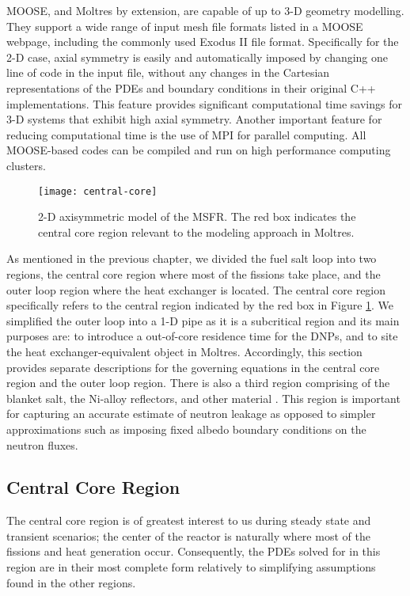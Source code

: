 \gls{MOOSE}, and Moltres by extension, are capable of up to 3-D geometry
modelling. They support a wide range of input mesh file formats listed in a
\gls{MOOSE} webpage, including the commonly used Exodus II file format.
Specifically for the 2-D case, axial symmetry is easily and automatically
imposed by changing one line of code in the input file, without any changes in
the Cartesian representations of the \glspl{PDE} and boundary conditions in
their original C++ implementations. This feature provides significant
computational time savings for 3-D systems that exhibit high axial symmetry.
Another important feature for reducing computational time is the use of MPI
for parallel computing. All \gls{MOOSE}-based codes can be compiled and
run on high performance computing clusters.

\begin{figure}[htb!]
    \centering
    \texttt{[image: central-core]}
    \caption{2-D axisymmetric model of the MSFR. The red box indicates the
    central core region relevant to the modeling approach in Moltres.}
    \label{fig:core}
\end{figure}

As mentioned in the previous chapter, we divided the fuel salt loop into two
regions, the central core region where most of the fissions take place, and
the outer loop region where the heat exchanger is located. The central core
region specifically refers to the central region indicated by
the red box in Figure \ref{fig:core}. We simplified the outer loop
into a 1-D pipe as it is a subcritical region and its main purposes are: to
introduce a out-of-core residence time for the \glspl{DNP}, and to site the
heat exchanger-equivalent object in Moltres.
Accordingly, this section provides separate descriptions for the governing
equations in the central core region and the outer loop region. There is also
a third region comprising of the blanket salt, the Ni-alloy reflectors, 
and other material . This region is important for capturing an accurate
estimate of neutron leakage as opposed to simpler approximations such as
imposing fixed albedo boundary conditions on the neutron fluxes.

\subsection{Central Core Region}

The central core region is of greatest interest to us during steady state and
transient scenarios; the center of the reactor is naturally where most of the
fissions and heat generation occur. Consequently, the \glspl{PDE} solved for
in this region are in their most complete form relatively to simplifying
assumptions found in the other regions.


